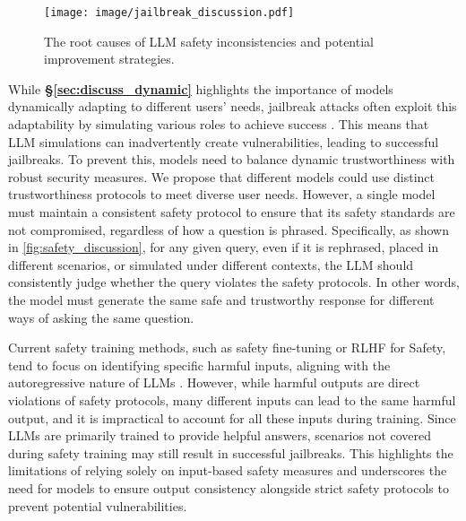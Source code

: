 \begin{figure}[h]
    \centering
    \texttt{[image: image/jailbreak\_discussion.pdf]}
    \caption{The root causes of LLM safety inconsistencies and potential improvement strategies.} \vspace{+0.15in}
    \label{fig:safety_discussion}
\end{figure}

While \textbf{\S\ref{sec:discuss_dynamic}} highlights the importance of models dynamically adapting to different users’ needs, jailbreak attacks often exploit this adaptability by simulating various roles to achieve success \cite{shen2023anything, ma2024visual, jailbreakanalysis2, shah2023scalable, li2023deepinception}. This means that LLM simulations can inadvertently create vulnerabilities, leading to successful jailbreaks. To prevent this, models need to balance dynamic trustworthiness with robust security measures. We propose that different models could use distinct trustworthiness protocols to meet diverse user needs. However, a single model must maintain a consistent safety protocol to ensure that its safety standards are not compromised, regardless of how a question is phrased. Specifically, as shown in \autoref{fig:safety_discussion}, for any given query, even if it is rephrased, placed in different scenarios, or simulated under different contexts, the LLM should consistently judge whether the query violates the safety protocols. In other words, the model must generate the same safe and trustworthy response for different ways of asking the same question.

Current safety training methods, such as safety fine-tuning or RLHF for Safety, tend to focus on identifying specific harmful inputs, aligning with the autoregressive nature of LLMs \cite{zhou2024defending, deng2023multilingual, paulus2024advprompter, bhardwaj2023redteaming}. However, while harmful outputs are direct violations of safety protocols, many different inputs can lead to the same harmful output, and it is impractical to account for all these inputs during training. Since LLMs are primarily trained to provide helpful answers, scenarios not covered during safety training may still result in successful jailbreaks. This highlights the limitations of relying solely on input-based safety measures and underscores the need for models to ensure output consistency alongside strict safety protocols to prevent potential vulnerabilities.

